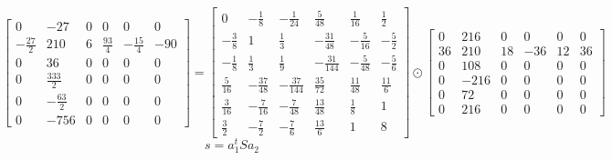 \documentclass{article}%
\begin{document}
\[%
\left[\begin{matrix}0 & -27 & 0 & 0 & 0 & 0\\- \frac{27}{2} & 210 & 6 & \frac{93}{4} & - \frac{15}{4} & -90\\0 & 36 & 0 & 0 & 0 & 0\\0 & \frac{333}{2} & 0 & 0 & 0 & 0\\0 & - \frac{63}{2} & 0 & 0 & 0 & 0\\0 & -756 & 0 & 0 & 0 & 0\end{matrix}\right] = \left[\begin{matrix}0 & - \frac{1}{8} & - \frac{1}{24} & \frac{5}{48} & \frac{1}{16} & \frac{1}{2}\\- \frac{3}{8} & 1 & \frac{1}{3} & - \frac{31}{48} & - \frac{5}{16} & - \frac{5}{2}\\- \frac{1}{8} & \frac{1}{3} & \frac{1}{9} & - \frac{31}{144} & - \frac{5}{48} & - \frac{5}{6}\\\frac{5}{16} & - \frac{37}{48} & - \frac{37}{144} & \frac{35}{72} & \frac{11}{48} & \frac{11}{6}\\\frac{3}{16} & - \frac{7}{16} & - \frac{7}{48} & \frac{13}{48} & \frac{1}{8} & 1\\\frac{3}{2} & - \frac{7}{2} & - \frac{7}{6} & \frac{13}{6} & 1 & 8\end{matrix}\right] \odot \left[\begin{matrix}0 & 216 & 0 & 0 & 0 & 0\\36 & 210 & 18 & -36 & 12 & 36\\0 & 108 & 0 & 0 & 0 & 0\\0 & -216 & 0 & 0 & 0 & 0\\0 & 72 & 0 & 0 & 0 & 0\\0 & 216 & 0 & 0 & 0 & 0\end{matrix}\right]%
\]%
\[%
s = a_1^t S a_2%
\]%
\end{document}
